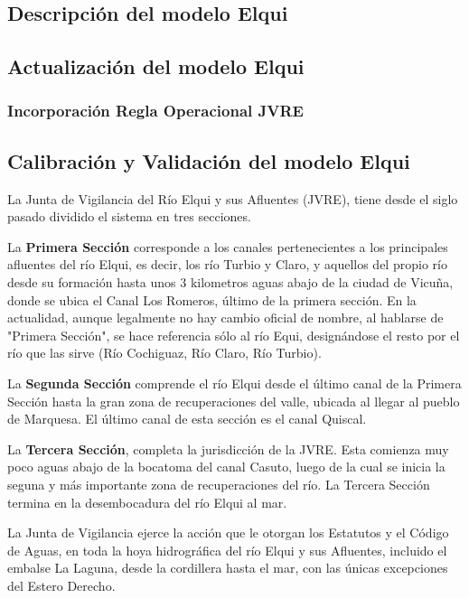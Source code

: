 \documentclass[11pt,]{article}
\begin{document}
		\subsection{Descripción del modelo Elqui}
		\subsection{Actualización del modelo Elqui}\bigskip
		
			\subsubsection{Incorporación Regla Operacional JVRE}\bigskip
			
		\subsection{Calibración y Validación del modelo Elqui}
		

La Junta de Vigilancia del Río Elqui y sus Afluentes (JVRE), tiene desde el siglo pasado dividido el sistema en tres secciones.\bigskip

La \textbf {Primera Sección} corresponde a los canales pertenecientes a los principales afluentes del río Elqui, es decir, los río Turbio y Claro, y aquellos del propio río desde su formación hasta unos 3 kilometros aguas abajo de la ciudad de Vicuña, donde se ubica el Canal Los Romeros, último de la primera sección. En la actualidad, aunque legalmente no hay cambio oficial de nombre, al hablarse de "Primera Sección", se hace referencia sólo al río Equi, designándose el resto por el río que las sirve (Río Cochiguaz, Río Claro, Río Turbio).\bigskip

La \textbf {Segunda Sección} comprende el río Elqui desde el último canal de la Primera Sección hasta la gran zona de recuperaciones del valle, ubicada al llegar al pueblo de Marquesa. El último canal de esta sección es el canal Quiscal.\bigskip

La \textbf {Tercera Sección}, completa la jurisdicción de la JVRE. Esta comienza muy poco aguas abajo de la bocatoma del canal Casuto, luego de la cual se inicia la seguna y más importante zona de recuperaciones del río. La Tercera Sección termina en la desembocadura del río Elqui al mar.\bigskip

La Junta de Vigilancia ejerce la acción que le otorgan los Estatutos y el Código de Aguas, en toda la hoya hidrográfica del río Elqui y sus Afluentes, incluido el embalse La Laguna, desde la cordillera hasta el mar, con las únicas excepciones del Estero Derecho.\bigskip
\end{document}
